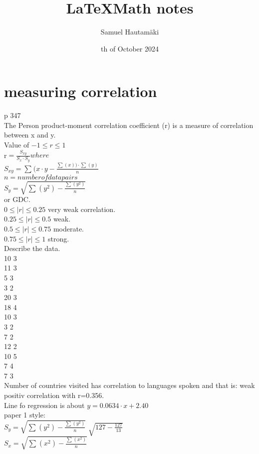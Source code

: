 \documentclass{article}
\title{\LaTeX Math notes}
\author{Samuel Hautamäki}
\date{th of October 2024}
\begin{document}
  \maketitle
   
  \section{measuring correlation}
  p 347\\
  The Person product-moment correlation coefficient (r) is a measure of correlation between x and y.\\
  Value of $-1\leq r \leq 1$\\
  r$=\frac{S_{xy}}{S_x \cdot S_y} where$\\
  $S_{xy}=\sum_{}^{}(x\cdot y-\frac{\sum_{}^{}(x))\cdot \sum_{}^{}(y)}{n}$\\
  $n= number of data pairs$\\
  $S_y=\sqrt{\sum_{}^{}(y^2)-\frac{\sum_{}^{}(y^2)}{n}}$\\
  or GDC.\\
  $0 \leq |r| \leq 0.25$ very weak correlation.\\
  $0.25 \leq |r| \leq 0.5$ weak.\\
  $0.5 \leq |r| \leq 0.75$ moderate.\\
  $0.75 \leq |r| \leq 1$ strong.\\
  Describe the data.\\
  10 3\\
  11 3\\
  5 3\\
  3 2\\
  20 3\\
  18 4\\
  10 3\\
  3 2\\
  7 2\\
  12 2\\
  10 5\\
  7 4\\
  7 3\\
  Number of countries visited has correlation to languages spoken and that is: weak positiv correlation with r=0.356.\\
  Line fo regression is about $y=0.0634\cdot x+2.40$\\
  paper 1 style:\\
  $S_y=\sqrt{\sum_{}^{}(y^2)-\frac{\sum_{}^{}(y^2)}{n}}$
  $\sqrt{127-\frac{127}{13}}$\\
  $S_x=\sqrt{\sum_{}^{}(x^2)-\frac{\sum_{}^{}(x^2)}{n}}$ 
\end{document}
